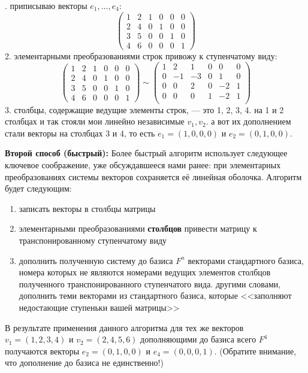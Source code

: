 \documentclass[10pt, a4paper]{extarticle}
\theoremstyle{definition}
\begin{document}
. приписываю векторы $e_1, \dots, e_4$:
\[
\begin{pmatrix}
    1 & 2 & 1 & 0 & 0 & 0 \\
    2 & 4 & 0 & 1 & 0 & 0 \\
    3 & 5 & 0 & 0 & 1 & 0 \\
    4 & 6 & 0 & 0 & 0 & 1 
\end{pmatrix}    
\]
2. элементарными преобразованиями строк привожу к ступенчатому виду:
\[
\begin{pmatrix}
    1 & 2 & 1 & 0 & 0 & 0 \\
    2 & 4 & 0 & 1 & 0 & 0 \\
    3 & 5 & 0 & 0 & 1 & 0 \\
    4 & 6 & 0 & 0 & 0 & 1 
\end{pmatrix}
\sim
\begin{pmatrix}
    1 & 2 & 1 & 0 & 0 & 0 \\
    0 & -1 & -3 & 0 & 1 & 0 \\
    0 & 0 & 2 & 0 & -2 & 1 \\
    0 & 0 & 0 & 1 & -2 & 1 \\ 
\end{pmatrix}
\]
3. столбцы, содержащие ведущие элементы строк, --- это 1, 2, 3, 4. на 1 и 2 столбцах и так стояли мои линейно независимые $v_1, v_2$.
а вот их дополнением стали векторы на столбцах 3 и 4, то есть $e_1 = (1,0,0,0)$ и $e_2 = (0,1,0,0)$.

\textbf{Второй способ (быстрый):}
Более быстрый алгоритм использует следующее ключевое соображение, уже обсуждавшееся нами ранее: при элементарных преобразованиях 
системы векторов сохраняется её линейная оболочка. Алгоритм будет следующим:
\begin{enumerate}
    \item записать векторы в столбцы матрицы
    \item элементарными преобразованиями \textbf{столбцов} привести матрицу к транспонированному ступенчатому виду
    \item дополнить полученную систему до базиса $F^n$ векторами стандартного базиса, номера которых не 
    являются номерами ведущих элементов столбцов полученного транспонированного ступенчатого вида. другими словами, дополнить теми
    векторами из стандартного базиса, которые <<заполняют недостающие ступеньки вашей матрицы>>
\end{enumerate}

В результате применения данного алгоритма для тех же векторов $v_1 = (1,2,3,4)$ и $v_2 = (2,4,5,6)$ дополняющими до базиса всего $F^4$ 
получаются векторы $e_2 = (0,1,0,0)$ и $e_4 = (0,0,0,1)$. (Обратите внимание, что дополнение до базиса не единственно!)
\end{document}
